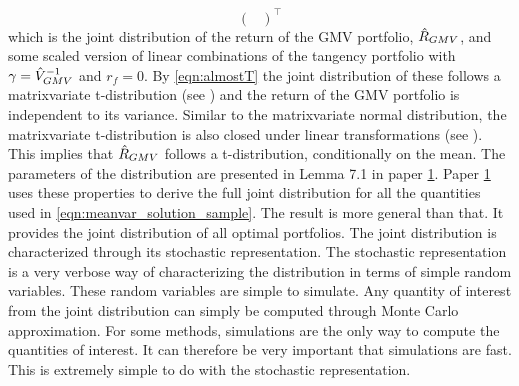 \documentclass[12pt, oneside]{book}\usepackage{knitr}
\begin{document}
{$$\begin{pmatrix}
\end{pmatrix}^\top
$$
which is the joint distribution of the return of the GMV portfolio, $\hat{R}_{GMV}$, and some scaled version of linear combinations of the tangency portfolio with $\gamma = \hat{V}_{GMV}^{-1}$ and $r_f=0$.
By \eqref{eqn:almostT} the joint distribution of these follows a matrixvariate t-distribution (see \citet[Definition 4.2.1]{GuptaNagar2000}) and the return of the GMV portfolio is independent to its variance. 
Similar to the matrixvariate normal distribution, the matrixvariate t-distribution is also closed under linear transformations (see \citet[Theorem 4.3.5]{GuptaNagar2000}).
This implies that $\hat{R}_{GMV}$ follows a t-distribution, conditionally on the mean.
The parameters of the distribution are presented in Lemma 7.1 in paper \hyperref[sec:paper1]{1}. 
Paper \hyperref[sec:paper1]{1} uses these properties to derive the full joint distribution for all the quantities used in \eqref{eqn:meanvar_solution_sample}.
The result is more general than that.
It provides the joint distribution of all optimal portfolios. 
The joint distribution is characterized through its stochastic representation.
The stochastic representation is a very verbose way of characterizing the distribution in terms of simple random variables.
These random variables are simple to simulate.
Any quantity of interest from the joint distribution can simply be computed through Monte Carlo approximation. 
For some methods, simulations are the only way to compute the quantities of interest.
It can therefore be very important that simulations are fast.
This is extremely simple to do with the stochastic representation.

}
\end{document}
